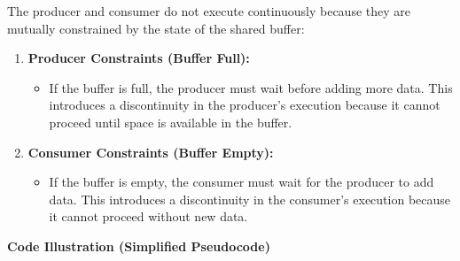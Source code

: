 \documentclass[a4paper]{book}
\begin{document}
The producer and consumer do not execute continuously because they are mutually constrained by the state of the shared buffer:
\begin{enumerate}
\item 
\textbf{Producer Constraints (Buffer Full):}
\begin{itemize}
\item 
If the buffer is full, the producer must wait before adding more data. This introduces a discontinuity in the producer's execution because it cannot proceed until space is available in the buffer.

\end{itemize}

\item 

\textbf{Consumer Constraints (Buffer Empty):}

\begin{itemize}
\item 
If the buffer is empty, the consumer must wait for the producer to add data. This introduces a discontinuity in the consumer's execution because it cannot proceed without new data.

\end{itemize}

\end{enumerate}

\textbf{Code Illustration (Simplified Pseudocode)}
\end{document}
